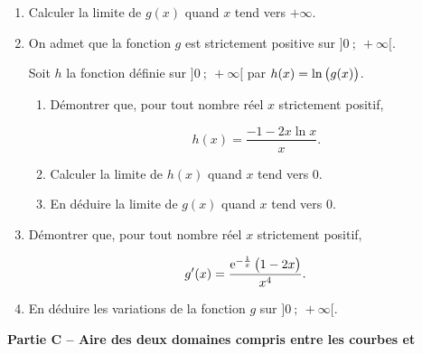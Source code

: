 \documentclass[10pt,a4paper]{article}
\def\e{\text{e}}
\begin{document}
\begin{enumerate}
\item Calculer la limite de $g(x)$ quand $x$ tend vers $+\infty$.
\item On admet que la fonction $g$ est strictement positive sur $]0~;~+\infty[$.

Soit $h$ la fonction définie sur $]0~;~+\infty[$ par $h(x)=\ln\left ( g(x) \strut\right )$.

\begin{enumerate}
\item Démontrer que, pour tout nombre réel $x$ strictement positif,

\[h(x)= \dfrac{-1-2x\ln x}{x}.\]
\item Calculer la limite de $h(x)$ quand $x$ tend vers 0.
\item En déduire la limite de $g(x)$ quand $x$ tend vers 0.
\end{enumerate}

\item Démontrer que, pour tout nombre réel $x$ strictement positif,

\[g'(x)= \dfrac{\e^{-\frac{1}{x}}\left (1-2x \strut\right )}{x^4}.\]

\item En déduire les variations de la fonction $g$ sur $]0~;~+\infty[$.
\end{enumerate}

\bigskip

\textbf{Partie C -- Aire des deux domaines compris entre les courbes  et }

\medskip 
\end{document}
